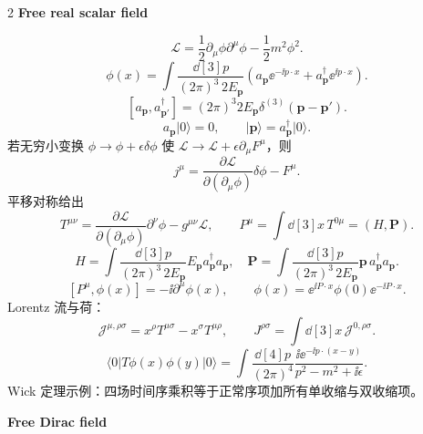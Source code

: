 \begin{multicols}{2}
\textbf{Free real scalar field}

\[
\mathcal L=\frac12\partial_\mu\phi\partial^\mu\phi-\frac12m^2\phi^2.
\]
\[
\phi(x)=\int\frac{\dd[3]{p}}{(2\pi)^3\,2E_{\mathbf p}}
\left(a_{\mathbf p}\ee^{-\ii p\cdot x}+a_{\mathbf p}^\dagger\ee^{\ii p\cdot x}\right).
\]
\[
[a_{\mathbf p},a_{\mathbf p'}^\dagger]=(2\pi)^3 2E_{\mathbf p}\delta^{(3)}(\mathbf p-\mathbf p').
\]
\[
a_{\mathbf p}|0\rangle=0,
\qquad |\mathbf p\rangle=a_{\mathbf p}^\dagger|0\rangle.
\]
若无穷小变换 $\phi\to\phi+\epsilon\delta\phi$ 使
$\mathcal L\to\mathcal L+\epsilon\partial_\mu F^\mu$，则
\[
j^\mu=\frac{\partial\mathcal L}{\partial(\partial_\mu\phi)}\delta\phi-F^\mu.
\]
平移对称给出
\[
T^{\mu\nu}=\frac{\partial\mathcal L}{\partial(\partial_\mu\phi)}\partial^\nu\phi-g^{\mu\nu}\mathcal L,
\qquad
P^\mu=\int\dd[3]{x}\,T^{0\mu}=(H,\mathbf P).
\]
\[
H=\int\frac{\dd[3]{p}}{(2\pi)^3\,2E_{\mathbf p}}
E_{\mathbf p}a_{\mathbf p}^\dagger a_{\mathbf p},
\quad
\mathbf P=\int\frac{\dd[3]{p}}{(2\pi)^3\,2E_{\mathbf p}}
\mathbf p\,a_{\mathbf p}^\dagger a_{\mathbf p}.
\]
\[
[P^\mu,\phi(x)]=-\ii\partial^\mu\phi(x),
\qquad \phi(x)=\ee^{\ii P\cdot x}\phi(0)\ee^{-\ii P\cdot x}.
\]
Lorentz 流与荷：
\[
\mathcal J^{\mu,\rho\sigma}=x^\rho T^{\mu\sigma}-x^\sigma T^{\mu\rho},
\qquad
J^{\rho\sigma}=\int\dd[3]{x}\,\mathcal J^{0,\rho\sigma}.
\]
\[
\langle0|T\phi(x)\phi(y)|0\rangle
=\int\frac{\dd[4]{p}}{(2\pi)^4}\frac{\ii\ee^{-\ii p\cdot(x-y)}}{p^2-m^2+\ii\epsilon}.
\]
Wick 定理示例：四场时间序乘积等于正常序项加所有单收缩与双收缩项。

\columnbreak
\textbf{Free Dirac field}


\end{multicols}
